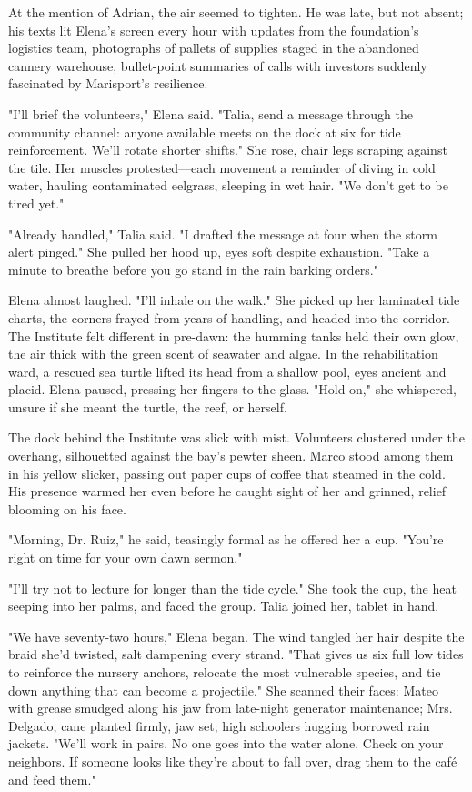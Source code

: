 At the mention of Adrian, the air seemed to tighten. He was late, but not absent; his texts lit Elena's screen every hour with updates from the foundation's logistics team, photographs of pallets of supplies staged in the abandoned cannery warehouse, bullet-point summaries of calls with investors suddenly fascinated by Marisport's resilience.

"I'll brief the volunteers," Elena said. "Talia, send a message through the community channel: anyone available meets on the dock at six for tide reinforcement. We'll rotate shorter shifts." She rose, chair legs scraping against the tile. Her muscles protested—each movement a reminder of diving in cold water, hauling contaminated eelgrass, sleeping in wet hair. "We don't get to be tired yet."

"Already handled," Talia said. "I drafted the message at four when the storm alert pinged." She pulled her hood up, eyes soft despite exhaustion. "Take a minute to breathe before you go stand in the rain barking orders."

Elena almost laughed. "I'll inhale on the walk." She picked up her laminated tide charts, the corners frayed from years of handling, and headed into the corridor. The Institute felt different in pre-dawn: the humming tanks held their own glow, the air thick with the green scent of seawater and algae. In the rehabilitation ward, a rescued sea turtle lifted its head from a shallow pool, eyes ancient and placid. Elena paused, pressing her fingers to the glass. "Hold on," she whispered, unsure if she meant the turtle, the reef, or herself.

The dock behind the Institute was slick with mist. Volunteers clustered under the overhang, silhouetted against the bay's pewter sheen. Marco stood among them in his yellow slicker, passing out paper cups of coffee that steamed in the cold. His presence warmed her even before he caught sight of her and grinned, relief blooming on his face.

"Morning, Dr. Ruiz," he said, teasingly formal as he offered her a cup. "You're right on time for your own dawn sermon."

"I'll try not to lecture for longer than the tide cycle." She took the cup, the heat seeping into her palms, and faced the group. Talia joined her, tablet in hand.

"We have seventy-two hours," Elena began. The wind tangled her hair despite the braid she'd twisted, salt dampening every strand. "That gives us six full low tides to reinforce the nursery anchors, relocate the most vulnerable species, and tie down anything that can become a projectile." She scanned their faces: Mateo with grease smudged along his jaw from late-night generator maintenance; Mrs. Delgado, cane planted firmly, jaw set; high schoolers hugging borrowed rain jackets. "We'll work in pairs. No one goes into the water alone. Check on your neighbors. If someone looks like they're about to fall over, drag them to the café and feed them."

